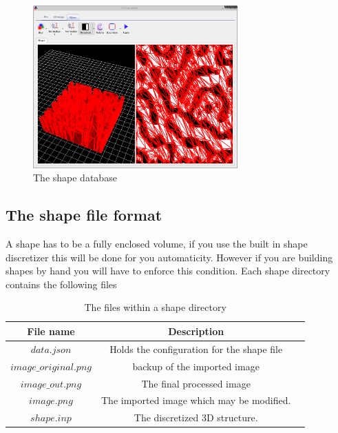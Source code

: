 \begin{figure}[H]
\centering
\includegraphics[width=0.7\textwidth]{./images/database_shapes/example2.png}
\caption{The shape database}
\label{fig:shapedb_example2}
\end{figure}


\subsection{The shape file format}

A shape has to be a fully enclosed volume, if you use the built in shape discretizer this will be done for you automaticity.  However if you are building shapes by hand you will have to enforce this condition. Each shape directory contains the following files

\begin{table}[H]
\begin{center}
\begin{tabular}{ |c|c|c| } 
 \hline
	File name 			& 	Description  \\ 
 \hline
	$data.json$ 			&	Holds the configuration for the shape file \\ 
	$image\_original.png$ 	&	backup of the imported image\\ 
	$image\_out.png$ 	& The final processed image  \\
	$image.png$ 	&	The imported image which may be modified.    \\
	$shape.inp$ 	&	The discretized 3D structure.   \\

 \hline
\end{tabular}
\caption{The files within a shape directory}
\label{tab:files_in_shape_dir}
\end{center}
\end{table}

